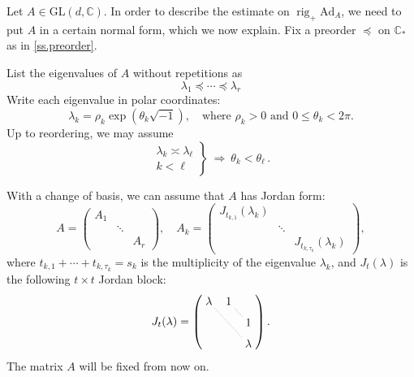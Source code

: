 \documentclass[10pt, a4paper]{amsart}
\theoremstyle{plain}
\theoremstyle{definition}
\theoremstyle{remark}
\theoremstyle{note}
\numberwithin{equation}{section}
\begin{document}
Let $A \in {\mathrm{GL}}(d,{\mathbb{C}})$.
In order to describe the estimate on $\operatorname{rig}_+ {\mathrm{Ad}}_A$, 
we need to put $A$ in a certain normal form, which we now explain. 
Fix a preorder $\preccurlyeq$ on ${\mathbb{C}}_*$ as in \cref{ss.preorder}.

\medskip

List the eigenvalues of $A$ without repetitions as
\begin{equation}\label{e.order lambdas}
\lambda_1 \preccurlyeq \cdots \preccurlyeq \lambda_r
\end{equation}
Write each eigenvalue in polar coordinates:
$$
\lambda_k = \rho_k \exp ( \theta_k \sqrt{-1}), \quad
\text{where } \rho_k > 0 \text { and } 0 \leq \theta_k <  2 \pi.
$$
Up to reordering, we may assume
$$
\left.
\begin{array}{l}
\lambda_k \asymp \lambda_\ell \\
k < \ell
\end{array}
\right\} \ \Rightarrow \ 
\theta_k < \theta_\ell \, .
$$

With a change of basis, we can assume that 
$A$ has Jordan form: 
\begin{equation}\label{e.order blocks}
A =
\begin{pmatrix}
A_1  &        &     \\
     & \ddots &     \\
     &        & A_r      
\end{pmatrix}, \quad 
A_k =
\begin{pmatrix}
J_{t_{k,1}}(\lambda_k) &        &                         \\
                       & \ddots &                         \\
                       &        & J_{t_{k,\tau_k}}(\lambda_k)      
\end{pmatrix},
\end{equation}
where $t_{k,1} + \cdots + t_{k,\tau_k} = s_k$ is the multiplicity of the eigenvalue $\lambda_k$,
and $J_t(\lambda)$ is the following $t \times t$ Jordan block:
\begin{equation}\label{e.block}
J_t(\lambda) = 
\left(
\vcenter{
\xymatrix @-1.5pc {
\lambda \ar@{.}[rrdd]  & 1 \ar@{.}[rd] &         \\
                 &               & 1       \\
                 &               & \lambda \\
}}
\right).
\end{equation}
The matrix $A$ will be fixed from now on.
\end{document}
